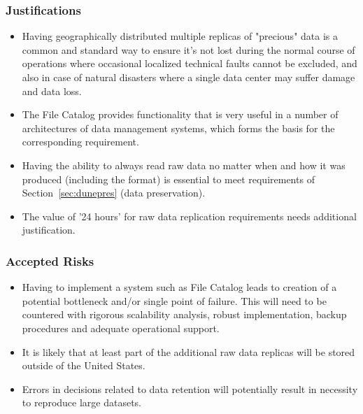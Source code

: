 \subsubsection{Justifications}
\begin{itemize}
\item Having geographically distributed multiple replicas of "precious" data is a common and standard way to ensure it's not lost during the normal course of operations where occasional localized technical faults cannot be excluded, and also in case of natural disasters where a single data center may suffer damage and data loss.

\item The File Catalog provides functionality that is very useful in a number of architectures of data management systems, which forms the basis for the corresponding requirement.

\item Having the ability to always read raw data no matter when and how it was produced (including the format) is essential to meet requirements of Section~\ref{sec:dunepres} (data preservation).
\item The value of '24 hours' for raw data replication requirements needs additional justification. 
\end{itemize}
\subsubsection{Accepted Risks}
\begin{itemize}
\item Having to implement a system such as File Catalog leads to creation of a potential bottleneck and/or single point of failure. This will need to be countered with rigorous scalability analysis, robust implementation, backup procedures and adequate operational support.

\item It is likely that at least part of the additional raw data replicas will be stored outside of the United States.

\item Errors in decisions related to data retention will potentially result in necessity to reproduce large datasets.
\end{itemize}
